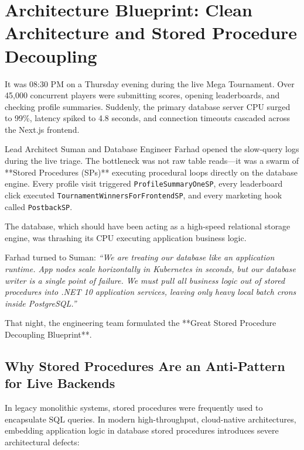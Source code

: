 \chapter{Architecture Blueprint: Clean Architecture and Stored Procedure Decoupling}

\begin{tcolorbox}[storybox, title={The Story of the 08:30 PM Database Meltdown and the Decoupling Epiphany}]
It was 08:30 PM on a Thursday evening during the live Mega Tournament. Over 45,000 concurrent players were submitting scores, opening leaderboards, and checking profile summaries. Suddenly, the primary database server CPU surged to 99\%, latency spiked to 4.8 seconds, and connection timeouts cascaded across the Next.js frontend.

Lead Architect Suman and Database Engineer Farhad opened the slow-query logs during the live triage. The bottleneck was not raw table reads—it was a swarm of **Stored Procedures (SPs)** executing procedural loops directly on the database engine. Every profile visit triggered \texttt{ProfileSummaryOneSP}, every leaderboard click executed \texttt{TournamentWinnersForFrontendSP}, and every marketing hook called \texttt{PostbackSP}.

The database, which should have been acting as a high-speed relational storage engine, was thrashing its CPU executing application business logic.

Farhad turned to Suman: \textit{``We are treating our database like an application runtime. App nodes scale horizontally in Kubernetes in seconds, but our database writer is a single point of failure. We must pull all business logic out of stored procedures into .NET 10 application services, leaving only heavy local batch crons inside PostgreSQL.''}

That night, the engineering team formulated the **Great Stored Procedure Decoupling Blueprint**.
\end{tcolorbox}

\section{Why Stored Procedures Are an Anti-Pattern for Live Backends}
In legacy monolithic systems, stored procedures were frequently used to encapsulate SQL queries. In modern high-throughput, cloud-native architectures, embedding application logic in database stored procedures introduces severe architectural defects:

